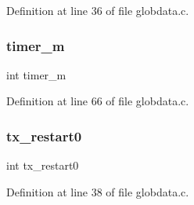 Definition at line 36 of file globdata.\+c.

\mbox{\label{globdata_8h_af0a20ab26c2b3b439005217214274f46}} 
\subsubsection{timer\+\_\+m}
{\footnotesize\ttfamily int timer\+\_\+m}



Definition at line 66 of file globdata.\+c.

\mbox{\label{globdata_8h_a4e4a764ef1e2e444d44c2c733f23f28d}} 
\subsubsection{tx\+\_\+restart0}
{\footnotesize\ttfamily int tx\+\_\+restart0}



Definition at line 38 of file globdata.\+c.

